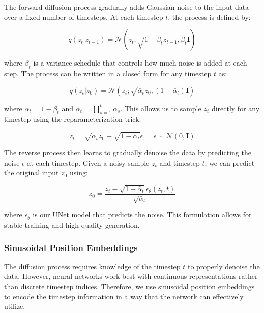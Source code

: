The forward diffusion process gradually adds Gaussian noise to the input data over a fixed number of timesteps. At each timestep $t$, the process is defined by:

\begin{equation}
    q(z_t|z_{t-1}) = \mathcal{N}(z_t; \sqrt{1-\beta_t}z_{t-1}, \beta_t\mathbf{I})
\end{equation}

\noindent where $\beta_t$ is a variance schedule that controls how much noise is added at each step. The process can be written in a closed form for any timestep $t$ as:

\begin{equation}
    q(z_t|z_0) = \mathcal{N}(z_t; \sqrt{\bar{\alpha}_t}z_0, (1-\bar{\alpha}_t)\mathbf{I})
\end{equation}

\noindent where $\alpha_t = 1-\beta_t$ and $\bar{\alpha}_t = \prod_{s=1}^t \alpha_s$. This allows us to sample $z_t$ directly for any timestep using the reparameterization trick:

\begin{equation}
    z_t = \sqrt{\bar{\alpha}_t}z_0 + \sqrt{1-\bar{\alpha}_t}\epsilon, \quad \epsilon \sim \mathcal{N}(0, \mathbf{I})
\end{equation}

The reverse process then learns to gradually denoise the data by predicting the noise $\epsilon$ at each timestep. Given a noisy sample $z_t$ and timestep $t$, we can predict the original input $z_0$ using:

\begin{equation}
    z_0 = \frac{z_t - \sqrt{1-\bar{\alpha}_t}\epsilon_\theta(z_t,t)}{\sqrt{\bar{\alpha}_t}}
\end{equation}

\noindent where $\epsilon_\theta$ is our UNet model that predicts the noise. This formulation allows for stable training and high-quality generation.

\subsubsection{Sinusoidal Position Embeddings}

The diffusion process requires knowledge of the timestep $t$ to properly denoise the data. However, neural networks work best with continuous representations rather than discrete timestep indices. Therefore, we use sinusoidal position embeddings to encode the timestep information in a way that the network can effectively utilize.

